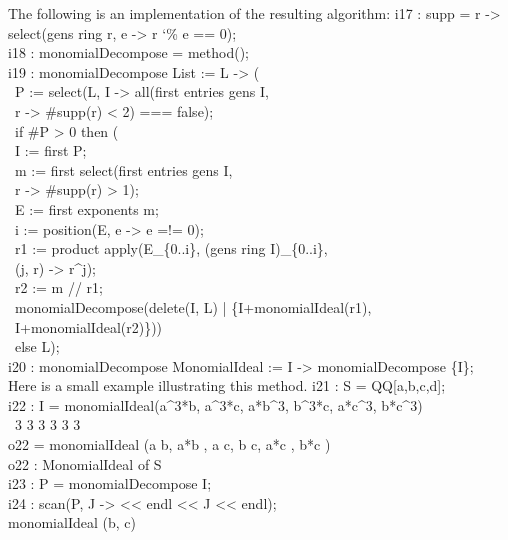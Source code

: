 The following is an implementation of the resulting algorithm:
\beginOutput
i17 : supp = r -> select(gens ring r, e -> r {\char`\%} e == 0);\\
\endOutput
\beginOutput
i18 : monomialDecompose = method();\\
\endOutput
\beginOutput
i19 : monomialDecompose List := L -> (\\
\           P := select(L, I -> all(first entries gens I, \\
\                     r -> #supp(r) < 2) === false);\\
\           if #P > 0 then (\\
\                I := first P;\\
\                m := first select(first entries gens I, \\
\                     r -> #supp(r) > 1);\\
\                E := first exponents m;\\
\                i := position(E, e -> e =!= 0);\\
\                r1 := product apply(E_\{0..i\}, (gens ring I)_\{0..i\}, \\
\                     (j, r) -> r^j);\\
\                r2 := m // r1;\\
\                monomialDecompose(delete(I, L) | \{I+monomialIdeal(r1),\\
\                          I+monomialIdeal(r2)\}))\\
\           else L);\\
\endOutput
\beginOutput
i20 : monomialDecompose MonomialIdeal := I -> monomialDecompose \{I\};\\
\endOutput
Here is a small example illustrating this method.
\beginOutput
i21 : S = QQ[a,b,c,d];\\
\endOutput
\beginOutput
i22 : I = monomialIdeal(a^3*b, a^3*c, a*b^3, b^3*c, a*c^3, b*c^3)\\
\emptyLine
\                      3      3   3    3      3     3\\
o22 = monomialIdeal (a b, a*b , a c, b c, a*c , b*c )\\
\emptyLine
o22 : MonomialIdeal of S\\
\endOutput
\beginOutput
i23 : P = monomialDecompose I;\\
\endOutput
\beginOutput
i24 : scan(P, J -> << endl << J << endl);\\
\emptyLine
monomialIdeal (b, c)\\
\emptyLine
